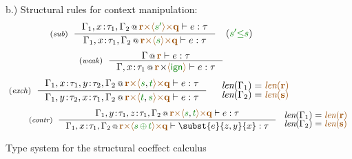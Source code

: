 \begin{figure}[t]
\vspace{1em}
{\small b.) Structural rules for context manipulation:}
\begin{equation*}
\tyrule{sub}
  {\coctx{\Gamma_1,x\!:\!\tau_1,\Gamma_2}{\aclrd{\textbf{r}} \atimes \alift{\cclrd{s'}} \atimes \aclrd{\textbf{q}}} \vdash e : \tau}
  {\coctx{\Gamma_1,x\!:\!\tau_1,\Gamma_2}{\aclrd{\textbf{r}} \atimes \alift{\cclrd{s}} \atimes \aclrd{\textbf{q}}} \vdash e : \tau}
\quad
(\cclrd{s'} \cleq \cclrd{s})
\end{equation*}
\begin{equation*}
\tyrule{weak}
  {\coctx{\Gamma}{ \aclrd{\textbf{r}} } \vdash e : \tau}
  {\coctx{\Gamma,x \!:\! \tau_1}{\aclrd{\textbf{r}} \cons \alift{ \czero }} \vdash e : \tau} 
\end{equation*}
\begin{equation*}
\tyrule{exch}
  {\coctx{\Gamma_1,x\!:\!\tau_1,y\!:\!\tau_2,\Gamma_2}{\aclrd{\textbf{r}} \atimes \alift{\cclrd{s},\cclrd{t}} \atimes \aclrd{\textbf{q}}} \vdash e : \tau}
  {\coctx{\Gamma_1,y\!:\!\tau_2,x\!:\!\tau_1,\Gamma_2}{\aclrd{\textbf{r}} \atimes \alift{\cclrd{t},\cclrd{s}} \atimes \aclrd{\textbf{q}}} \vdash e : \tau}
\quad
\begin{array}{l}
 \xlift{\Gamma_1} = \slift{\aclrd{\textbf{r}}}\\[-0.25em]
 \xlift{\Gamma_2} = \slift{\aclrd{\textbf{s}}}
\end{array}
\end{equation*}
\begin{equation*}
\hspace{2.5em} 
\tyrule{contr}
  {\coctx{\Gamma_1,y\!:\!\tau_1,z\!:\!\tau_1,\Gamma_2}{\aclrd{\textbf{r}} \atimes \alift{\cclrd{s},\cclrd{t}} \atimes \aclrd{\textbf{q}}} \vdash e : \tau}
  {\coctx{\Gamma_1,x\!:\!\tau_1,\Gamma_2}{\aclrd{\textbf{r}} \atimes \alift{\cclrd{s} \,\cpar\, \cclrd{t}} \atimes \aclrd{\textbf{q}}} \vdash \subst{e}{z,y}{x} : \tau}
~
\begin{array}{l}
 \xlift{\Gamma_1} = \slift{\aclrd{\textbf{r}}}\\[-0.25em]
 \xlift{\Gamma_2} = \slift{\aclrd{\textbf{s}}}
\end{array}
\end{equation*}

\caption{Type system for the structural coeffect calculus}
\label{fig:struct-types}
\end{figure}



